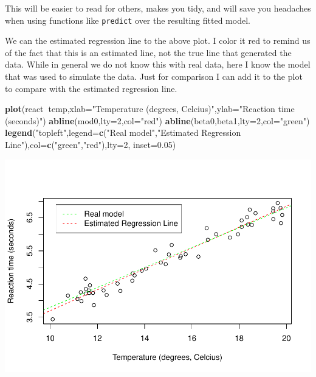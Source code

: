 \documentclass[
]{book}
\newenvironment{Shaded}{\begin{snugshade}}{\end{snugshade}}
\newcommand{\DataTypeTok}[1]{\textcolor[rgb]{0.13,0.29,0.53}{#1}}
\newcommand{\DecValTok}[1]{\textcolor[rgb]{0.00,0.00,0.81}{#1}}
\newcommand{\FloatTok}[1]{\textcolor[rgb]{0.00,0.00,0.81}{#1}}
\newcommand{\KeywordTok}[1]{\textcolor[rgb]{0.13,0.29,0.53}{\textbf{#1}}}
\newcommand{\NormalTok}[1]{#1}
\newcommand{\OperatorTok}[1]{\textcolor[rgb]{0.81,0.36,0.00}{\textbf{#1}}}
\newcommand{\StringTok}[1]{\textcolor[rgb]{0.31,0.60,0.02}{#1}}
\begin{document}
This will be easier to read for others, makes you tidy, and will save you headaches when using functions like \texttt{predict} over the resulting fitted model.

We can the estimated regression line to the above plot. I color it red to remind us of the fact that this is an estimated line, not the true line that generated the data. While in general we do not know this with real data, here I know the model that was used to simulate the data. Just for comparison I can add it to the plot to compare with the estimated regression line.

\begin{Shaded}
\begin{Highlighting}[]
\KeywordTok{plot}\NormalTok{(react}\OperatorTok{~}\NormalTok{temp,}\DataTypeTok{xlab=}\StringTok{"Temperature (degrees, Celcius)"}\NormalTok{,}\DataTypeTok{ylab=}\StringTok{"Reaction time (seconds)"}\NormalTok{)}
\KeywordTok{abline}\NormalTok{(mod0,}\DataTypeTok{lty=}\DecValTok{2}\NormalTok{,}\DataTypeTok{col=}\StringTok{"red"}\NormalTok{)}
\KeywordTok{abline}\NormalTok{(beta0,beta1,}\DataTypeTok{lty=}\DecValTok{2}\NormalTok{,}\DataTypeTok{col=}\StringTok{"green"}\NormalTok{)}
\KeywordTok{legend}\NormalTok{(}\StringTok{"topleft"}\NormalTok{,}\DataTypeTok{legend=}\KeywordTok{c}\NormalTok{(}\StringTok{"Real model"}\NormalTok{,}\StringTok{"Estimated Regression Line"}\NormalTok{),}\DataTypeTok{col=}\KeywordTok{c}\NormalTok{(}\StringTok{"green"}\NormalTok{,}\StringTok{"red"}\NormalTok{),}\DataTypeTok{lty=}\DecValTok{2}\NormalTok{, }\DataTypeTok{inset=}\FloatTok{0.05}\NormalTok{)}
\end{Highlighting}
\end{Shaded}

\includegraphics{ECOMODbook_files/figure-latex/reg9-1.pdf}
\end{document}
